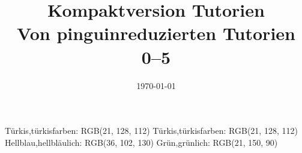 \def\thpath{./data}
\RequirePackage{color-palettes}
{Türkis,türkisfarben: RGB(21, 128, 112)}
{Türkis,türkisfarben: RGB(21, 128, 112)}
{Hellblau,hellbläulich: RGB(36, 102, 130)}
{Grün,grünlich: RGB(21, 150, 90)}
\def\btdmopts{color=paletteA}%
\def\btdmmode{lightmode-fill}

\usepackage{fmtcount}

%
%
\fullfalse
\def\maxtut{5}
\titlenumber{0--\maxtut}
\title[Alle Tutorien 0--\maxtut]{Kompaktversion Tutorien\\\small Von pinguinreduzierten Tutorien 0--\maxtut}
\date{\sffamily\today}


\let\oldinputif\InputIfFileExists

\makeatletter
\usepackage{pgfcalendar}
\edef\semesterstartyear{2022}
\def\startkwofsemester{16} %
\newcount\@kwconverter
\newcount\@firstweekday
{}
\def\getstartdayofweek#1#2{%
      \ifnum#1<\startkwofsemester \edef\@year{\the\numexpr\semesterstartyear+1}%
      \else\let\@year\semesterstartyear\fi
      \pgfcalendardatetojulian{\@year-1-1}{\@kwconverter}\pgfcalendarjuliantoweekday\@kwconverter\@firstweekday
            \edef\@day{\the\numexpr#1*7-\number\@firstweekday+#2\relax}%
      \pgfcalendardatetojulian{\@year-1-1+\@day}{\@kwconverter}%
      \pgfcalendarjuliantodate{\@kwconverter}\@year\@month\@day
      \DTMdisplaydate\@year\@month\@day\m@ne\relax
}

\def\getKwRange#1{\getstartdayofweek{#1}0\,---\,\getstartdayofweek{#1}6}

